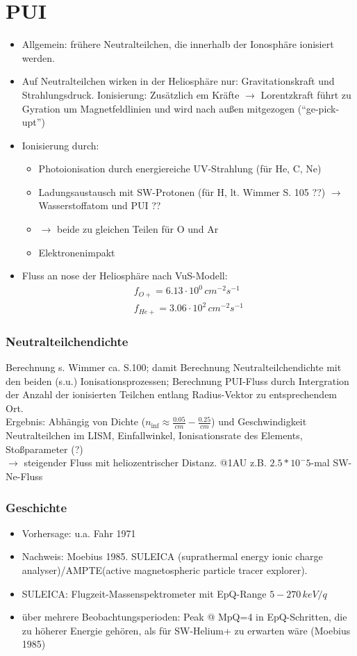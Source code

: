 \documentclass[]{article}
\begin{document}
\section{PUI}
\begin{itemize}
	\item Allgemein: frühere Neutralteilchen, die innerhalb der Ionosphäre ionisiert werden.
	\item Auf Neutralteilchen wirken in der Heliosphäre nur: Gravitationskraft und Strahlungsdruck. Ionisierung: Zusätzlich em Kräfte $\rightarrow$ Lorentzkraft führt zu Gyration um Magnetfeldlinien und wird nach außen mitgezogen (``ge-pick-upt'')
	\item Ionisierung durch:
	\begin{itemize}
		\item Photoionisation durch energiereiche UV-Strahlung (für He, C, Ne)
		\item Ladungsaustausch mit SW-Protonen (für H, lt. Wimmer S. 105 ??) $\rightarrow$ Wasserstoffatom und PUI ??
		\item $\rightarrow$ beide zu gleichen Teilen für O und Ar
		\item Elektronenimpakt
	\end{itemize}
	\item Fluss an nose der Heliosphäre nach VuS-Modell:
	\begin{align*}
	f_{O+} = 6.13\cdot10^0\,cm^{-2}s^{-1} \\
	f_{He+} = 3.06\cdot10^2\,cm^{-2}s^{-1}
	\end{align*}
\end{itemize}


\subsubsection{Neutralteilchendichte} Berechnung s. Wimmer ca. S.100; damit Berechnung Neutralteilchendichte mit den beiden (s.u.) Ionisationsprozessen; Berechnung PUI-Fluss durch Intergration der Anzahl der ionisierten Teilchen entlang Radius-Vektor zu entsprechendem Ort.
\\
Ergebnis: Abhängig von Dichte ($n_{\inf} \approx \frac{0.05}{cm} - \frac{0.25}{cm}$) und Geschwindigkeit Neutralteilchen im LISM, Einfallwinkel, Ionisationsrate des Elements, Stoßparameter (?)\\
$\rightarrow$ steigender Fluss mit heliozentrischer Distanz. @1AU z.B. $2.5*10^-5$-mal SW-Ne-Fluss
%
\subsubsection{Geschichte}
\begin{itemize}
	\item Vorhersage: u.a. Fahr 1971
	\item Nachweis: Moebius 1985. SULEICA (suprathermal energy ionic charge analyser)/AMPTE(active magnetospheric particle tracer explorer).
	\item SULEICA: Flugzeit-Massenspektrometer mit EpQ-Range $5-270\,keV/q$
	\item über mehrere Beobachtungsperioden: Peak @ MpQ=4 in EpQ-Schritten, die zu höherer Energie gehören, als für SW-Helium+ zu erwarten wäre (Moebius 1985)
\end{itemize}
\end{document}
